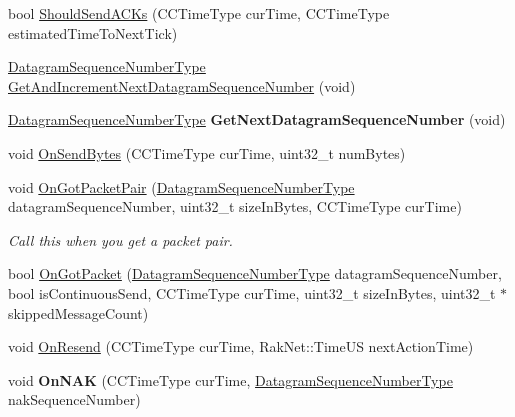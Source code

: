 \begin{DoxyCompactItemize}
\item 
bool \hyperlink{class_rak_net_1_1_c_c_rak_net_sliding_window_aebb13b16d6e6601f191a48f5da5aed05}{Should\-Send\-A\-C\-Ks} (C\-C\-Time\-Type cur\-Time, C\-C\-Time\-Type estimated\-Time\-To\-Next\-Tick)
\item 
\hyperlink{struct_rak_net_1_1uint24__t}{Datagram\-Sequence\-Number\-Type} \hyperlink{class_rak_net_1_1_c_c_rak_net_sliding_window_a143bddc1be41f1ea910b400cf403749d}{Get\-And\-Increment\-Next\-Datagram\-Sequence\-Number} (void)
\item 
\hypertarget{class_rak_net_1_1_c_c_rak_net_sliding_window_a0cf92f5a4f33e481bb73ab93c6ae6345}{\hyperlink{struct_rak_net_1_1uint24__t}{Datagram\-Sequence\-Number\-Type} {\bfseries Get\-Next\-Datagram\-Sequence\-Number} (void)}\label{class_rak_net_1_1_c_c_rak_net_sliding_window_a0cf92f5a4f33e481bb73ab93c6ae6345}

\item 
void \hyperlink{class_rak_net_1_1_c_c_rak_net_sliding_window_a67bc237267f26e02f7607a075a82e385}{On\-Send\-Bytes} (C\-C\-Time\-Type cur\-Time, uint32\-\_\-t num\-Bytes)
\item 
\hypertarget{class_rak_net_1_1_c_c_rak_net_sliding_window_ad9b18795ecb3c09311a3482229003de1}{void \hyperlink{class_rak_net_1_1_c_c_rak_net_sliding_window_ad9b18795ecb3c09311a3482229003de1}{On\-Got\-Packet\-Pair} (\hyperlink{struct_rak_net_1_1uint24__t}{Datagram\-Sequence\-Number\-Type} datagram\-Sequence\-Number, uint32\-\_\-t size\-In\-Bytes, C\-C\-Time\-Type cur\-Time)}\label{class_rak_net_1_1_c_c_rak_net_sliding_window_ad9b18795ecb3c09311a3482229003de1}

\begin{DoxyCompactList}\small\item\em Call this when you get a packet pair. \end{DoxyCompactList}\item 
bool \hyperlink{class_rak_net_1_1_c_c_rak_net_sliding_window_a9b09736b3bdb68855b02a1054fc8e861}{On\-Got\-Packet} (\hyperlink{struct_rak_net_1_1uint24__t}{Datagram\-Sequence\-Number\-Type} datagram\-Sequence\-Number, bool is\-Continuous\-Send, C\-C\-Time\-Type cur\-Time, uint32\-\_\-t size\-In\-Bytes, uint32\-\_\-t $\ast$skipped\-Message\-Count)
\item 
void \hyperlink{class_rak_net_1_1_c_c_rak_net_sliding_window_a9b6125fb3cc8955cd666c514ac642988}{On\-Resend} (C\-C\-Time\-Type cur\-Time, Rak\-Net\-::\-Time\-U\-S next\-Action\-Time)
\item 
\hypertarget{class_rak_net_1_1_c_c_rak_net_sliding_window_a8f65af8f9f4ae908760c44678b4a196c}{void {\bfseries On\-N\-A\-K} (C\-C\-Time\-Type cur\-Time, \hyperlink{struct_rak_net_1_1uint24__t}{Datagram\-Sequence\-Number\-Type} nak\-Sequence\-Number)}\label{class_rak_net_1_1_c_c_rak_net_sliding_window_a8f65af8f9f4ae908760c44678b4a196c}


\end{DoxyCompactItemize}
